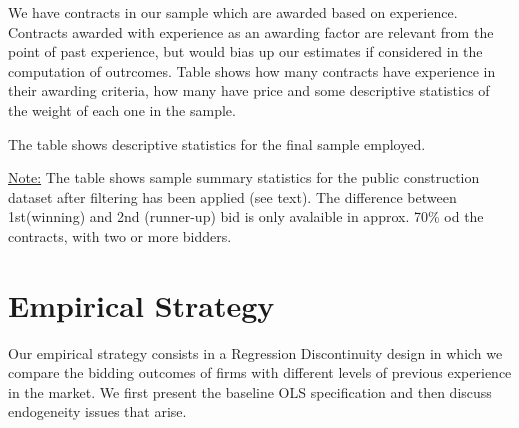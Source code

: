 We have contracts in our sample which are awarded based on experience. Contracts awarded with experience as an awarding factor are relevant from the point of past experience, but would bias up our estimates if considered in the computation of outrcomes. Table shows how many contracts have experience in their awarding criteria, how many have price and some descriptive statistics of the weight of each one in the sample.

The table shows descriptive statistics for the final sample employed.
\begin{table}[!h]

\caption{Descriptive Statistics}
\centering
{}
\vskip 0.5mm
{\raggedright \footnotesize \underline{Note:} The table shows sample summary statistics for the public construction dataset after filtering has been applied (see text). The difference between 1st(winning) and 2nd (runner-up) bid is only avalaible in approx. 70\% od the contracts, with two or more bidders. \par}
\end{table}



\section{Empirical Strategy}
Our empirical strategy consists in a Regression Discontinuity design in which we compare the bidding outcomes of firms with different levels of previous experience in the market. We first present the baseline OLS specification and then discuss endogeneity issues that arise.

